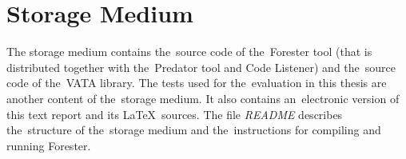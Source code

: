 \chapter{Storage Medium}
The storage medium contains the~source code of
the~Forester tool (that is distributed together with the~Predator tool
and Code Listener)
and the~source code of the~VATA library.
The tests used for the~evaluation in this thesis are
another content of the~storage medium.
It also contains an~electronic version of this text report
and its \LaTeX\ sources.
The file \emph{README} describes the~structure
of the~storage medium and the~instructions for compiling
and running Forester.


